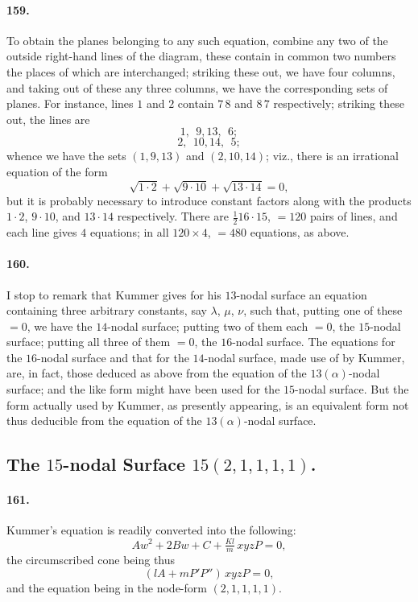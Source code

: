\documentclass[11pt,a4paper]{article}
\begin{document}
\paragraph{159.}
To obtain the planes belonging to any such equation, combine any two of
the outside right-hand lines of the diagram, these contain in common two
numbers the places of which are interchanged; striking these out, we have
four columns, and taking out of these any three columns, we have the
corresponding sets of planes. For instance, lines $1$ and $2$ contain
$7\,8$ and $8\,7$ respectively; striking these out, the lines are
\[
1,\ \ 9, 13,\ \ 6;
\]
\[
2,\ \ 10, 14,\ \ 5;
\]
whence we have the sets $(1, 9, 13)$ and $(2, 10, 14)$; viz., there is
an irrational equation of the form
\[
\sqrt{1 \cdot 2} + \sqrt{9 \cdot 10} + \sqrt{13 \cdot 14} = 0,
\]
but it is probably necessary to introduce constant factors along with the
products $1 \cdot 2$, $9 \cdot 10$, and $13 \cdot 14$ respectively. There
are $\tfrac{1}{2} 16 \cdot 15$, $= 120$ pairs of lines, and each line
gives $4$ equations; in all $120 \times 4$, $= 480$ equations, as above.

\paragraph{160.}
I stop to remark that Kummer gives for his $13$-nodal surface an equation
containing three arbitrary constants, say $\lambda$, $\mu$, $\nu$, such
that, putting one of these $= 0$, we have the $14$-nodal surface; putting
two of them each $= 0$, the $15$-nodal surface; putting all three of them
$= 0$, the $16$-nodal surface. The equations for the $16$-nodal surface
and that for the $14$-nodal surface, made use of by Kummer, are, in fact,
those deduced as above from the equation of the $13(\alpha)$-nodal
surface; and the like form might have been used for the $15$-nodal
surface. But the form actually used by Kummer, as presently appearing, is
an equivalent form not thus deducible from the equation of the
$13(\alpha)$-nodal surface.

\subsection*{The $15$-nodal Surface $15(2, 1, 1, 1, 1)$.}

\paragraph{161.}
Kummer's equation is readily converted into the following:
\[
Aw^2 + 2Bw + C + \tfrac{Kl}{m}\, xyzP = 0,
\]
the circumscribed cone being thus
\[
(lA + m P' P'')\, xyz P = 0,
\]
and the equation being in the node-form $(2, 1, 1, 1, 1)$.
\end{document}
